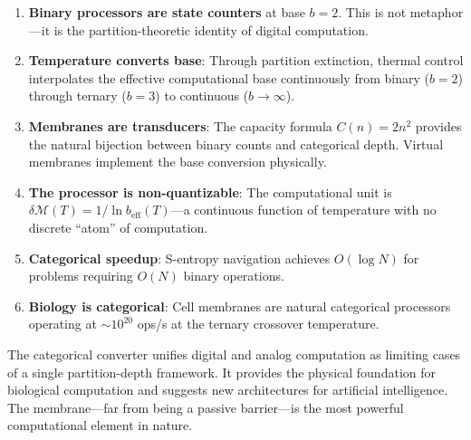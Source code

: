 \documentclass[twocolumn,10pt]{article}
\theoremstyle{remark}
\newcommand{\Depth}{\mathcal{M}}
\begin{document}
\begin{enumerate}
    \item \textbf{Binary processors are state counters} at base $b = 2$. This is not metaphor---it is the partition-theoretic identity of digital computation.

    \item \textbf{Temperature converts base}: Through partition extinction, thermal control interpolates the effective computational base continuously from binary ($b = 2$) through ternary ($b = 3$) to continuous ($b \to \infty$).

    \item \textbf{Membranes are transducers}: The capacity formula $C(n) = 2n^2$ provides the natural bijection between binary counts and categorical depth. Virtual membranes implement the base conversion physically.

    \item \textbf{The processor is non-quantizable}: The computational unit is $\delta\Depth(T) = 1/\ln b_{\text{eff}}(T)$---a continuous function of temperature with no discrete ``atom'' of computation.

    \item \textbf{Categorical speedup}: S-entropy navigation achieves $O(\log N)$ for problems requiring $O(N)$ binary operations.

    \item \textbf{Biology is categorical}: Cell membranes are natural categorical processors operating at $\sim 10^{20}$ ops/s at the ternary crossover temperature.
\end{enumerate}

The categorical converter unifies digital and analog computation as limiting cases of a single partition-depth framework. It provides the physical foundation for biological computation and suggests new architectures for artificial intelligence. The membrane---far from being a passive barrier---is the most powerful computational element in nature.



\end{document}

